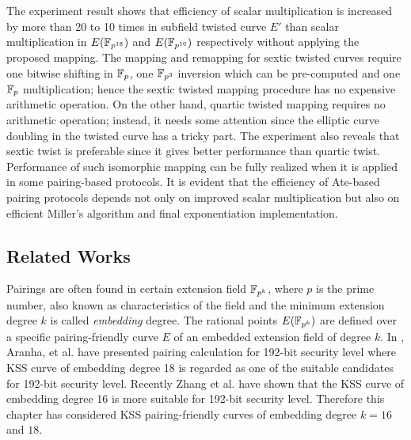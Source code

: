 The experiment result shows that efficiency of scalar multiplication is increased by more than 20 to 10 times in subfield  twisted curve $E'$ than scalar multiplication in $E(\mathbb{F}_{p^{18}})$ and $E(\mathbb{F}_{p^{16}})$ respectively without applying the proposed mapping. The mapping and remapping for sextic twisted curves require one bitwise shifting in ${\mathbb{F}}_{p}$, one $\mathbb{F}_{p^3}$ inversion which can be pre-computed and one ${\mathbb{F}}_{p}$ multiplication; hence the sextic twisted mapping procedure has no expensive arithmetic operation. On the other hand, quartic twisted mapping requires no arithmetic operation; instead, it needs some attention since the elliptic curve doubling in the twisted curve has a tricky part. The experiment also reveals that sextic twist is preferable since it gives better performance than quartic twist. 
Performance of such isomorphic mapping can be fully realized when it is applied in some pairing-based protocols. 
It is evident that the efficiency of Ate-based pairing protocols depends not only on improved scalar multiplication but also on efficient Miller's algorithm and final exponentiation implementation. 

\subsection{Related Works}
Pairings are often found in certain extension field $\mathbb{F}_{p^k}$, where $p$ is the prime number, also known as characteristics of the field and the minimum extension degree $k$ is called \textit{embedding} degree. 
The rational points $E(\mathbb{F}_{p^k})$ are defined over a specific pairing-friendly curve $E$ of an embedded extension field of degree $k$. 
In \cite{PAIRING:AFKMR12}, Aranha, et al. have presented pairing calculation for 192-bit security level where  KSS curve of embedding degree 18 is regarded as one of the suitable candidates for 192-bit security level.
Recently Zhang et al. \cite{INDOCRYPT:ZhaLin12} have shown that the KSS curve of embedding degree 16 is more suitable for 192-bit security level.
Therefore this chapter has considered KSS pairing-friendly curves of embedding degree $k=16$ and $18$.

